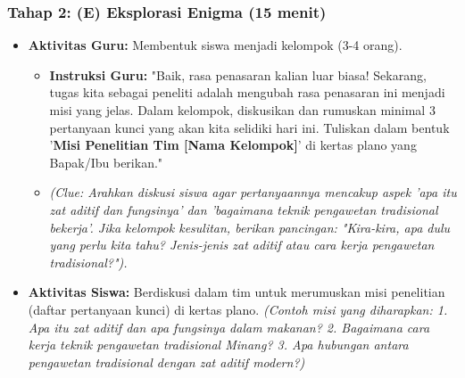 \documentclass[a4paper,12pt]{article}
\begin{document}
\subsubsection{Tahap 2: (E) Eksplorasi Enigma (15 menit)}
\begin{itemize}
\item \textbf{Aktivitas Guru:} Membentuk siswa menjadi kelompok (3-4 orang).
    \begin{itemize}
    \item \textbf{Instruksi Guru:} "Baik, rasa penasaran kalian luar biasa! Sekarang, tugas kita sebagai peneliti adalah mengubah rasa penasaran ini menjadi misi yang jelas. Dalam kelompok, diskusikan dan rumuskan minimal 3 pertanyaan kunci yang akan kita selidiki hari ini. Tuliskan dalam bentuk '\textbf{Misi Penelitian Tim [Nama Kelompok]}' di kertas plano yang Bapak/Ibu berikan."
    \item \textit{(Clue: Arahkan diskusi siswa agar pertanyaannya mencakup aspek 'apa itu zat aditif dan fungsinya' dan 'bagaimana teknik pengawetan tradisional bekerja'. Jika kelompok kesulitan, berikan pancingan: "Kira-kira, apa dulu yang perlu kita tahu? Jenis-jenis zat aditif atau cara kerja pengawetan tradisional?").}
    \end{itemize}
\item \textbf{Aktivitas Siswa:} Berdiskusi dalam tim untuk merumuskan misi penelitian (daftar pertanyaan kunci) di kertas plano. \textit{(Contoh misi yang diharapkan: 1. Apa itu zat aditif dan apa fungsinya dalam makanan? 2. Bagaimana cara kerja teknik pengawetan tradisional Minang? 3. Apa hubungan antara pengawetan tradisional dengan zat aditif modern?)}
\end{itemize}
\end{document}
